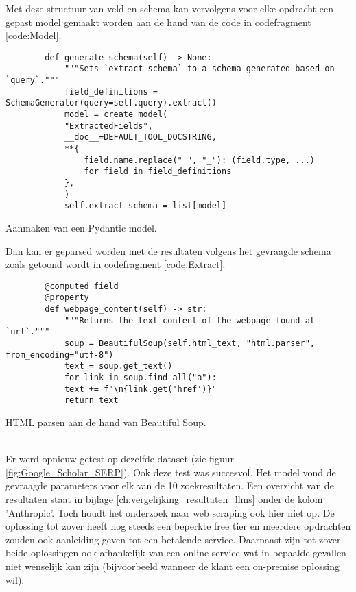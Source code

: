 Met deze structuur van veld en schema kan vervolgens voor elke opdracht een gepast model gemaakt worden aan de hand van de code in codefragment \ref{code:Model}.
\begin{listing}[h!]
    \begin{verbatim}
        def generate_schema(self) -> None:
            """Sets `extract_schema` to a schema generated based on `query`."""
            field_definitions = SchemaGenerator(query=self.query).extract()
            model = create_model(
            "ExtractedFields",
            __doc__=DEFAULT_TOOL_DOCSTRING,
            **{
                field.name.replace(" ", "_"): (field.type, ...)
                for field in field_definitions
            },
            )
            self.extract_schema = list[model]
    \end{verbatim}
    \caption[Pydantic model]{Aanmaken van een Pydantic model.}
    \label{code:Model}
\end{listing}
Dan kan er geparsed worden met de resultaten volgens het gevraagde schema zoals getoond wordt in codefragment \ref{code:Extract}.
\begin{listing}[h!]
    \begin{verbatim}
        @computed_field
        @property
        def webpage_content(self) -> str:
            """Returns the text content of the webpage found at `url`."""
            soup = BeautifulSoup(self.html_text, "html.parser", from_encoding="utf-8")
            text = soup.get_text()
            for link in soup.find_all("a"):
            text += f"\n{link.get('href')}"
            return text
    \end{verbatim}
    \caption[Beatiful Soup HTML parser]{HTML parsen aan de hand van Beautiful Soup.}
    \label{code:Extract}
\end{listing}
\\
Er werd opnieuw getest op dezelfde dataset  (zie figuur \ref{fig:Google_Scholar_SERP}). Ook deze test was succesvol. Het model vond de gevraagde parameters voor elk van de 10 zoekresultaten. Een overzicht van de resultaten staat in bijlage \ref{ch:vergelijking_resultaten_llms} onder de kolom 'Anthropic'. Toch houdt het onderzoek naar web scraping ook hier niet op. De oplossing tot zover heeft nog steeds een beperkte free tier en meerdere opdrachten zouden ook aanleiding geven tot een betalende service.
Daarnaast zijn tot zover beide oplossingen ook afhankelijk van een online service wat in bepaalde gevallen niet wenselijk kan zijn (bijvoorbeeld wanneer de klant een on-premise oplossing wil).
